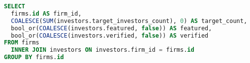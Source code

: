 \newpage

\begin{lstlisting}[frame=single,language=SQL,basicstyle=\tiny,columns=fullflexible,label={vcwiz:sql:view},caption={Denormalization of Individual Investor Properties}]
SELECT
  firms.id AS firm_id,
  COALESCE(SUM(investors.target_investors_count), 0) AS target_count,
  bool_or(COALESCE(investors.featured, false)) AS featured,
  bool_or(COALESCE(investors.verified, false)) AS verified
FROM firms
  INNER JOIN investors ON investors.firm_id = firms.id
GROUP BY firms.id
\end{lstlisting}

\clearpage
\newpage
